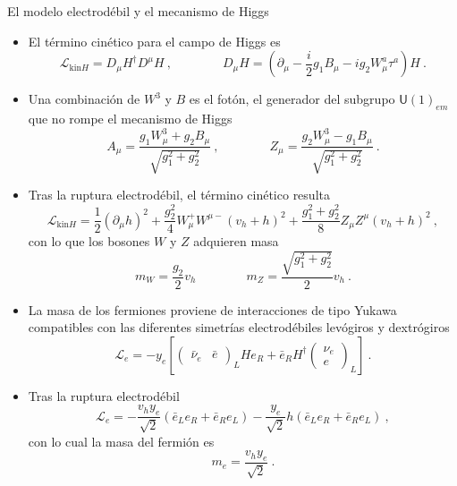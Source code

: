 \documentclass{beamer}
\begin{document}
\begin{frame}{El modelo electrodébil y el mecanismo de Higgs}
\begin{itemize}
\item<only@2> El término cinético para el campo de Higgs es
{\scriptsize\begin{equation}
\mathcal{L}_{\mathrm{kin} H} = D_\mu H^\dagger D^\mu H\ , \qquad\qquad
D_\mu H = \left(\partial_\mu  - \frac{i}{2} g_1 B_\mu -i g_2 W_\mu^a \tau^a  \right) H\ .
\end{equation}}
\item<only@2> Una combinación de $W^3$ y $B$ es el fotón, el generador del subgrupo $\mathsf{U}(1)_{em}$ que no rompe el mecanismo de Higgs
\begin{equation}
A_\mu = \frac{g_1 W_\mu^3 + g_2 B_\mu }{\sqrt{g_1^2 + g_2^2}}\ ,\qquad\qquad
Z_\mu = \frac{g_2 W_\mu^3 - g_1 B_\mu }{\sqrt{g_1^2 + g_2^2}}\ .
\end{equation}
\item<only@2> Tras la ruptura electrodébil, el término cinético resulta
\begin{equation}
\mathcal{L}_{\mathrm{kin}H} = \frac{1}{2}(\partial_\mu h)^2 + \frac{g_2^2}{4} W_\mu^+ W^{\mu-} (v_h + h)^2 + \frac{g_1^2 + g_2^2}{8}Z_\mu Z^\mu (v_h + h)^2\ , \label{eq:WZmassterm}
\end{equation}
con lo que los bosones $W$ y $Z$ adquieren masa
\begin{equation}
m_W= \frac{g_2}{2} v_h \qquad\qquad m_Z = \frac{\sqrt{g_1^2 + g_2^2}}{2}v_h\ .
\end{equation}
\item<only@3> La masa de los fermiones proviene de interacciones de tipo Yukawa compatibles con las diferentes simetrías electrodébiles levógiros y dextrógiros
\begin{equation}
\mathcal{L}_e = - y_e \left[ \begin{pmatrix}\bar{\nu}_e & \bar{e} \end{pmatrix}_L H e_R + \bar{e}_R H^\dagger \begin{pmatrix}\nu_e\\ e\end{pmatrix}_L \right]\ . \label{eq:yukawae}
\end{equation} 
\item<only@3> Tras la ruptura electrodébil
\begin{equation}
\mathcal{L}_e = -\frac{v_h y_e}{\sqrt{2}} (\bar{e}_L e_R + \bar{e}_R e_L)- \frac{y_e}{\sqrt{2}} h (\bar{e}_L e_R + \bar{e}_R e_L) \ ,
\end{equation}
con lo cual la masa del fermión es
\begin{equation}
m_e = \frac{v_h y_e}{\sqrt{2}}\ .
\end{equation}
\end{itemize}
\end{frame}
\end{document}
